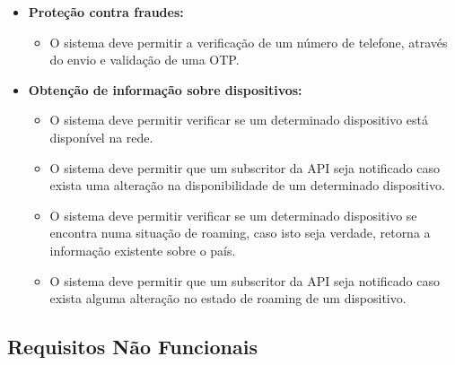 \begin{itemize}
  \item \textbf{Proteção contra fraudes:}
    \begin{itemize}
      \item O sistema deve permitir a verificação de um número de telefone, através do envio e validação de uma OTP.
    \end{itemize}

  \item \textbf{Obtenção de informação sobre dispositivos:}
    \begin{itemize}

      \item O sistema deve permitir verificar se um determinado dispositivo está disponível na rede.
      \item O sistema deve permitir que um subscritor da API seja notificado caso exista uma alteração na disponibilidade de um determinado dispositivo.
      \item O sistema deve permitir verificar se um determinado dispositivo se encontra numa situação de roaming, caso isto seja verdade, retorna a informação existente sobre o país.
      \item O sistema deve permitir que um subscritor da API seja notificado caso exista alguma alteração no estado de roaming de um dispositivo.
    \end{itemize}
\end{itemize}

\subsection{Requisitos Não Funcionais}

